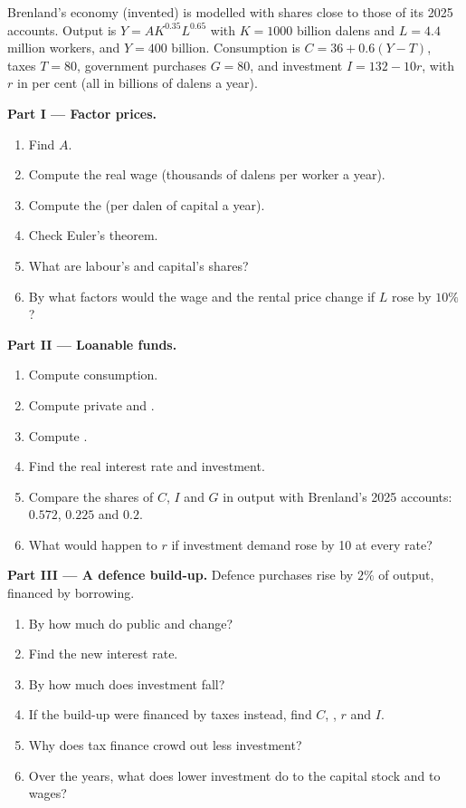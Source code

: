 \begin{problem}\label{pb:b1:long-run-model:brenland}
Brenland's economy (invented) is modelled with shares close to those of its
2025 accounts. Output is $Y = AK^{0.35}L^{0.65}$ with $K = 1000$ billion dalens and
$L = 4.4$ million workers, and $Y = 400$ billion. Consumption is
$C = 36 + 0.6(Y - T)$, taxes $T = 80$, government purchases $G = 80$, and investment
$I = 132 - 10r$, with $r$ in per cent (all in billions of dalens a year).

\medskip\noindent\textbf{Part I --- Factor prices.}
\begin{enumerate}
  \item Find $A$.
  \item Compute the real wage (thousands of dalens per worker a year).
  \item Compute the  (per dalen of capital a year).
  \item Check Euler's theorem.
  \item What are labour's and capital's shares?
  \item By what factors would the wage and the rental price change if $L$ rose by $10\%$?
\end{enumerate}

\medskip\noindent\textbf{Part II --- Loanable funds.}
\begin{enumerate}[resume]
  \item Compute consumption.
  \item Compute private and .
  \item Compute .
  \item Find the real interest rate and investment.
  \item Compare the shares of $C$, $I$ and $G$ in output with Brenland's 2025 accounts: $0.572$, $0.225$ and $0.2$.
  \item What would happen to $r$ if investment demand rose by 10 at every rate?
\end{enumerate}

\medskip\noindent\textbf{Part III --- A defence build-up.} Defence purchases rise
by $2\%$ of output, financed by borrowing.
\begin{enumerate}[resume]
  \item By how much do public and  change?
  \item Find the new interest rate.
  \item By how much does investment fall?
  \item If the build-up were financed by taxes instead, find $C$, , $r$ and $I$.
  \item Why does tax finance crowd out less investment?
  \item Over the years, what does lower investment do to the capital stock and to wages?
\end{enumerate}


\end{problem}
